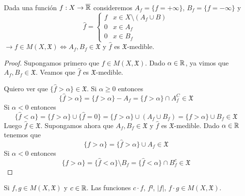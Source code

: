 \begin{lemma}
    Dada una función $f: X \to \overline{\mathbb{R}}$ consideremos $A_f = \{ f = +\infty \}$, $B_f = \{ f = -\infty \}$ y
    \begin{equation} \hat{f} = \begin{cases}
            f & x \in X \setminus (A_f \cup B) \\
            0 & x \in A_f                      \\
            0 & x \in B_f
        \end{cases}
    \end{equation}
    $\to f \in M(X, \mathfrak{X}) \iff A_f, B_f \in \mathfrak{X}$ y $\hat{f}$ es $\mathfrak{X}$-medible.
    \begin{proof}
        Supongamos primero que $f \in M(X, \mathfrak{X})$. Dado $\alpha \in \mathbb{R}$, ya vimos que $A_f, B_f \in \mathfrak{X}$. Veamos que $\hat{f}$ es $\mathfrak{X}$-medible.

        Quiero ver que $\{ \hat{f} > \alpha \} \in \mathfrak{X}$. Si $\alpha \geq 0$ entonces
        \begin{equation}
            \{ \hat{f} > \alpha \} = \{ f > \alpha \} - A_f = \{ f > \alpha \} \cap A_f^C \in \mathfrak{X}
        \end{equation}
        Si $\alpha < 0$ entonces \begin{equation}
            \{ \hat{f} < \alpha \} = \{ f > \alpha \} \cup \{ \hat{f} = 0 \} = \{ f > \alpha \} \cup (A_f \cup B_f) = \{ f > \alpha\} \cup B_f \in \mathfrak{X}
        \end{equation}
        Luego $\hat{f} \in \mathfrak{X}$. Supongamos ahora que $A_f, B_f \in \mathfrak{X}$ y $\hat{f}$ es $\mathfrak{X}$-medible. Dado $\alpha \in \mathbb{R}$ tenemos que \begin{equation}
            \{ f > \alpha \} = \{ \hat{f} > \alpha \} \cup A_f \in \mathfrak{X}
        \end{equation}
        Si $\alpha < 0$ entonces \begin{equation}
            \{ f > \alpha \} = \{ \hat{f} < \alpha \} \setminus B_f = \{ \hat{f} < \alpha \} \cap B_f^c \in \mathfrak{X}
        \end{equation}
    \end{proof}
\end{lemma}

\begin{corollary}
    Si $f, g \in M(X, \mathfrak{X})$ y $c \in \mathbb{R}$. Las funciones $c \cdot f$, $f²$, $|f|$, $f \cdot g \in M(X, \mathfrak{X})$.
\end{corollary}

